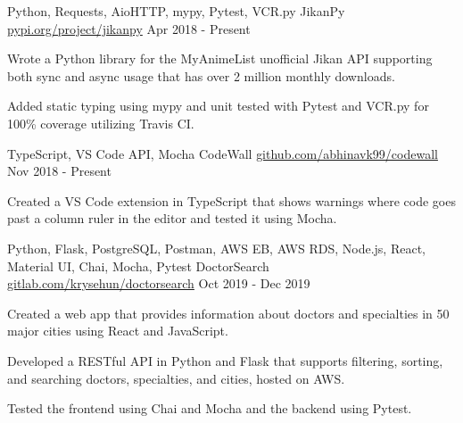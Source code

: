

\begin{cventries}

  \cventry
  {Python, Requests, AioHTTP, mypy, Pytest, VCR.py} %
  {JikanPy} %
  {\href{https://pypi.org/project/jikanpy/}{pypi.org/project/jikanpy}} %
  {Apr 2018 - Present} %
  {
    \begin{cvitems} %
      \item {Wrote a Python library for the MyAnimeList unofficial Jikan API supporting both sync and async usage that has over 2 million monthly downloads.}
      \item {Added static typing using mypy and unit tested with Pytest and VCR.py for 100\% coverage utilizing Travis CI.}
    \end{cvitems}
  }

  \cventry
  {TypeScript, VS Code API, Mocha} %
  {CodeWall} %
  {\href{https://github.com/abhinavk99/codewall}{github.com/abhinavk99/codewall}} %
  {Nov 2018 - Present} %
  {
    \begin{cvitems} %
      \item {Created a VS Code extension in TypeScript that shows warnings where code goes past a column ruler in the editor and tested it using Mocha.}
    \end{cvitems}
  }

  \cventry
  {Python, Flask, PostgreSQL, Postman, AWS EB, AWS RDS, Node.js, React, Material UI, Chai, Mocha, Pytest} %
  {DoctorSearch} %
  {\href{https://gitlab.com/krysehun/doctorsearch}{gitlab.com/krysehun/doctorsearch}} %
  {Oct 2019 - Dec 2019} %
  {
    \begin{cvitems} %
      \item {Created a web app that provides information about doctors and specialties in 50 major cities using React and JavaScript.}
      \item {Developed a RESTful API in Python and Flask that supports filtering, sorting, and searching doctors, specialties, and cities, hosted on AWS.}
      \item {Tested the frontend using Chai and Mocha and the backend using Pytest.}
    \end{cvitems}
  }

\end{cventries}
